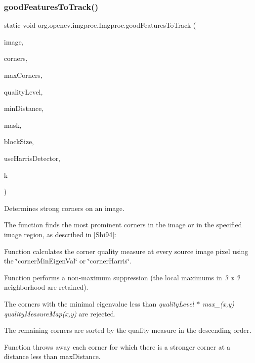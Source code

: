 \subsubsection{\texorpdfstring{good\+Features\+To\+Track()}{goodFeaturesToTrack()}\hspace{0.1cm}{\footnotesize\ttfamily [1/2]}}
{\footnotesize\ttfamily static void org.\+opencv.\+imgproc.\+Imgproc.\+good\+Features\+To\+Track (\begin{DoxyParamCaption}\item[{\mbox{\hyperlink{classorg_1_1opencv_1_1core_1_1_mat}{Mat}}}]{image,  }\item[{\mbox{\hyperlink{classorg_1_1opencv_1_1core_1_1_mat_of_point}{Mat\+Of\+Point}}}]{corners,  }\item[{int}]{max\+Corners,  }\item[{double}]{quality\+Level,  }\item[{double}]{min\+Distance,  }\item[{\mbox{\hyperlink{classorg_1_1opencv_1_1core_1_1_mat}{Mat}}}]{mask,  }\item[{int}]{block\+Size,  }\item[{boolean}]{use\+Harris\+Detector,  }\item[{double}]{k }\end{DoxyParamCaption})\hspace{0.3cm}{\ttfamily [static]}}

Determines strong corners on an image.

The function finds the most prominent corners in the image or in the specified image region, as described in \mbox{[}Shi94\mbox{]}\+:


\begin{DoxyItemize}
\item Function calculates the corner quality measure at every source image pixel using the \char`\"{}corner\+Min\+Eigen\+Val\char`\"{} or \char`\"{}corner\+Harris\char`\"{}. 
\item Function performs a non-\/maximum suppression (the local maximums in {\itshape 3 x 3} neighborhood are retained). 
\item The corners with the minimal eigenvalue less than {\itshape quality\+Level $\ast$ max\+\_\+(x,y) quality\+Measure\+Map(x,y)} are rejected. 
\item The remaining corners are sorted by the quality measure in the descending order. 
\item Function throws away each corner for which there is a stronger corner at a distance less than {\ttfamily max\+Distance}. 
\end{DoxyItemize}

